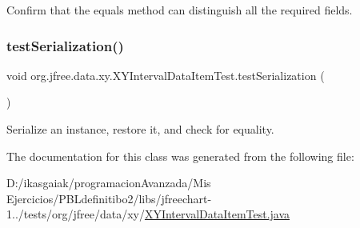 Confirm that the equals method can distinguish all the required fields. \mbox{\label{classorg_1_1jfree_1_1data_1_1xy_1_1_x_y_interval_data_item_test_a8106b4a3d4130c7aa00e3abdf14c6cd7}} 
\subsubsection{\texorpdfstring{test\+Serialization()}{testSerialization()}}
{\footnotesize\ttfamily void org.\+jfree.\+data.\+xy.\+X\+Y\+Interval\+Data\+Item\+Test.\+test\+Serialization (\begin{DoxyParamCaption}{ }\end{DoxyParamCaption})}

Serialize an instance, restore it, and check for equality. 

The documentation for this class was generated from the following file\+:\begin{DoxyCompactItemize}
\item 
D\+:/ikasgaiak/programacion\+Avanzada/\+Mis Ejercicios/\+P\+B\+Ldefinitibo2/libs/jfreechart-\/1../tests/org/jfree/data/xy/\mbox{\hyperlink{_x_y_interval_data_item_test_8java}{X\+Y\+Interval\+Data\+Item\+Test.\+java}}\end{DoxyCompactItemize}
